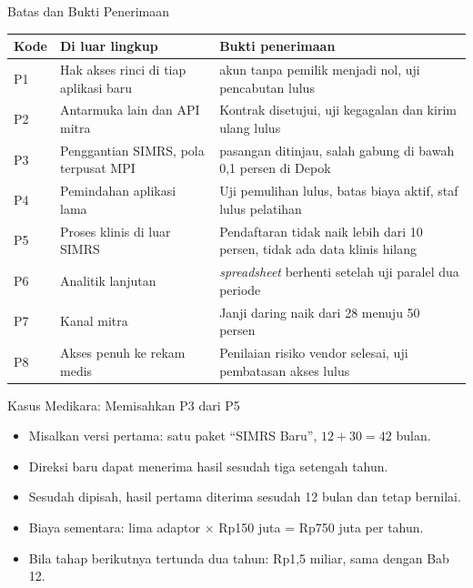 \documentclass[aspectratio=169, table, 12pt]{beamer}
\begin{document}
\begin{frame}{{\Large Batas dan Bukti Penerimaan}}
  \scriptsize
  \begin{tabularx}{\textwidth}{l>{\raggedright\arraybackslash}p{3.8cm}>{\raggedright\arraybackslash}X}
    \hline
    \textbf{Kode} & \textbf{Di luar lingkup} & \textbf{Bukti penerimaan} \\ \hline
    P1 & Hak akses rinci di tiap aplikasi baru & 212 akun tanpa pemilik menjadi nol, uji pencabutan lulus \\ \hline
    P2 & Antarmuka lain dan API mitra & Kontrak disetujui, uji kegagalan dan kirim ulang lulus \\ \hline
    P3 & Penggantian SIMRS, pola terpusat MPI & 9.000 pasangan ditinjau, salah gabung di bawah 0,1 persen di Depok \\ \hline
    P4 & Pemindahan aplikasi lama & Uji pemulihan lulus, batas biaya aktif, staf lulus pelatihan \\ \hline
    P5 & Proses klinis di luar SIMRS & Pendaftaran tidak naik lebih dari 10 persen, tidak ada data klinis hilang \\ \hline
    P6 & Analitik lanjutan & 23 \textit{spreadsheet} berhenti setelah uji paralel dua periode \\ \hline
    P7 & Kanal mitra & Janji daring naik dari 28 menuju 50 persen \\ \hline
    P8 & Akses penuh ke rekam medis & Penilaian risiko vendor selesai, uji pembatasan akses lulus \\ \hline
  \end{tabularx}
\end{frame}

\begin{frame}{{\Large Kasus Medikara: Memisahkan P3 dari P5}}
  \vspace{10pt}
  \begin{itemize}
    \item Misalkan versi pertama: satu paket ``SIMRS Baru'', $12 + 30 = 42$ bulan.
    \item Direksi baru dapat menerima hasil sesudah tiga setengah tahun.
    \item Sesudah dipisah, hasil pertama diterima sesudah 12 bulan dan tetap bernilai.
    \item Biaya sementara: lima adaptor $\times$ Rp150 juta = Rp750 juta per tahun.
    \item Bila tahap berikutnya tertunda dua tahun: Rp1,5 miliar, sama dengan Bab 12.
  \end{itemize}
\end{frame}
\end{document}
